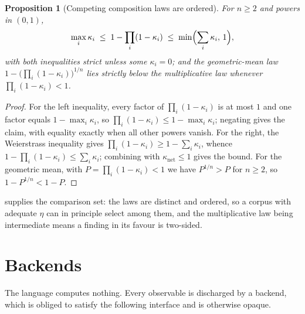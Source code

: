 \documentclass[11pt,twocolumn,a4paper]{article}
\theoremstyle{thmstyle}
\newtheorem{proposition}[theorem]{Proposition}
\theoremstyle{definition}
\theoremstyle{remark}
\newcommand{\kap}{\kappa}
\begin{document}
\begin{proposition}[Competing composition laws are ordered]
\label{prop:competitors}
For $n\ge2$ and powers in $(0,1)$,
\[
\max_i\kap_i \;\le\; 1-\prod_i(1-\kap_i)
\;\le\;\min\Bigl(\sum_i\kap_i,\,1\Bigr),
\]
with both inequalities strict unless some $\kap_i=0$; and the geometric-mean
law $1-\bigl(\prod_i(1-\kap_i)\bigr)^{1/n}$ lies strictly below the
multiplicative law whenever $\prod_i(1-\kap_i)<1$.
\end{proposition}

\begin{proof}
For the left inequality, every factor of $\prod_i(1-\kap_i)$ is at most $1$
and one factor equals $1-\max_i\kap_i$, so
$\prod_i(1-\kap_i)\le 1-\max_i\kap_i$; negating gives the claim, with equality
exactly when all other powers vanish. For the right, the Weierstrass
inequality gives $\prod_i(1-\kap_i)\ge 1-\sum_i\kap_i$, whence
$1-\prod_i(1-\kap_i)\le\sum_i\kap_i$; combining with
$\kap_{\mathrm{net}}\le1$ gives the bound. For the geometric mean, with
$P=\prod_i(1-\kap_i)<1$ we have $P^{1/n}>P$ for $n\ge2$, so
$1-P^{1/n}<1-P$.
\end{proof}

 supplies the comparison set: the laws are distinct and
ordered, so a corpus with adequate $\eta$ can in principle select among them,
and the multiplicative law being intermediate means a finding in its favour is
two-sided.

\section{Backends}
\label{sec:backends}

The language computes nothing. Every observable is discharged by a backend,
which is obliged to satisfy the following interface and is otherwise opaque.
\end{document}
